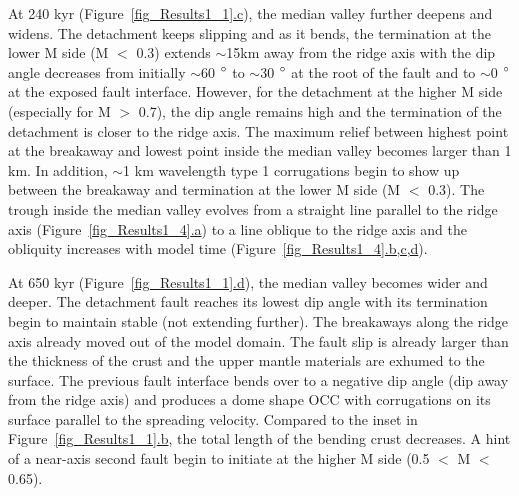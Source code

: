 At 240 kyr (Figure~\hyperref[fig_Results1_1]{\ref{fig_Results1_1}.c}), the median valley further deepens and widens. The detachment keeps slipping and as it bends, the termination at the lower M side (M $<$ 0.3) extends $\sim$15km away from the ridge axis with the dip angle decreases from initially $\sim$60 $\degree$ to $\sim$30 $\degree$ at the root of the fault and to $\sim$0 $\degree$ at the exposed fault interface. However, for the detachment at the higher M side (especially for M $>$ 0.7), the dip angle remains high and the termination of the detachment is closer to the ridge axis. The maximum relief between highest point at the breakaway and lowest point inside the median valley becomes larger than 1 km. In addition, $\sim$1 km wavelength type 1 corrugations begin to show up between the breakaway and termination at the lower M side (M $<$ 0.3). The trough inside the median valley evolves from a straight line parallel to the ridge axis (Figure~\hyperref[fig_Results1_4]{\ref{fig_Results1_4}.a}) to a line oblique to the ridge axis and the obliquity increases with model time (Figure~\hyperref[fig_Results1_4]{\ref{fig_Results1_4}.b,c,d}). 

At 650 kyr (Figure~\hyperref[fig_Results1_1]{\ref{fig_Results1_1}.d}), the median valley becomes wider and deeper. The detachment fault reaches its lowest dip angle with its termination begin to maintain stable (not extending further). The breakaways along the ridge axis already moved out of the model domain.
The fault slip is already larger than the thickness of the crust and the upper mantle materials are exhumed to the surface. The previous fault interface bends over to a negative dip angle (dip away from the ridge axis) and produces a dome shape OCC with corrugations on its surface parallel to the spreading velocity. Compared to the inset in Figure~\hyperref[fig_Results1_1]{\ref{fig_Results1_1}.b}, the total length of the bending crust decreases. A hint of a near-axis second fault begin to initiate at the higher M side (0.5 $<$ M $<$ 0.65).

